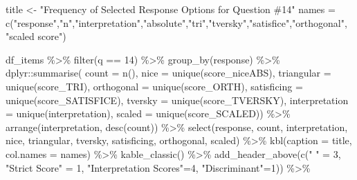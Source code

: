 \documentclass[
  letterpaper,
  DIV=11,
  numbers=noendperiod]{scrreprt}
\newenvironment{Shaded}{\begin{snugshade}}{\end{snugshade}}
\newcommand{\AttributeTok}[1]{\textcolor[rgb]{0.40,0.45,0.13}{#1}}
\newcommand{\DecValTok}[1]{\textcolor[rgb]{0.68,0.00,0.00}{#1}}
\newcommand{\FunctionTok}[1]{\textcolor[rgb]{0.28,0.35,0.67}{#1}}
\newcommand{\NormalTok}[1]{\textcolor[rgb]{0.00,0.23,0.31}{#1}}
\newcommand{\OtherTok}[1]{\textcolor[rgb]{0.00,0.23,0.31}{#1}}
\newcommand{\SpecialCharTok}[1]{\textcolor[rgb]{0.37,0.37,0.37}{#1}}
\newcommand{\StringTok}[1]{\textcolor[rgb]{0.13,0.47,0.30}{#1}}
\begin{document}
\begin{Shaded}
\begin{Highlighting}[]
\NormalTok{title }\OtherTok{\textless{}{-}} \StringTok{"Frequency of Selected Response Options for Question \#14"}
\NormalTok{names }\OtherTok{=} \FunctionTok{c}\NormalTok{(}\StringTok{"response"}\NormalTok{,}\StringTok{"n"}\NormalTok{,}\StringTok{"interpretation"}\NormalTok{,}\StringTok{"absolute"}\NormalTok{,}\StringTok{"tri"}\NormalTok{,}\StringTok{"tversky"}\NormalTok{,}\StringTok{"satisfice"}\NormalTok{,}\StringTok{"orthogonal"}\NormalTok{, }\StringTok{"scaled score"}\NormalTok{)}

\NormalTok{df\_items }\SpecialCharTok{\%\textgreater{}\%} \FunctionTok{filter}\NormalTok{(q }\SpecialCharTok{==} \DecValTok{14}\NormalTok{) }\SpecialCharTok{\%\textgreater{}\%} \FunctionTok{group\_by}\NormalTok{(response) }\SpecialCharTok{\%\textgreater{}\%}
\NormalTok{  dplyr}\SpecialCharTok{::}\FunctionTok{summarise}\NormalTok{( }\AttributeTok{count =} \FunctionTok{n}\NormalTok{(),}
                    \AttributeTok{nice =} \FunctionTok{unique}\NormalTok{(score\_niceABS),}
                    \AttributeTok{triangular =} \FunctionTok{unique}\NormalTok{(score\_TRI),}
                    \AttributeTok{orthogonal =}  \FunctionTok{unique}\NormalTok{(score\_ORTH),}
                    \AttributeTok{satisficing =}  \FunctionTok{unique}\NormalTok{(score\_SATISFICE),}
                    \AttributeTok{tversky =} \FunctionTok{unique}\NormalTok{(score\_TVERSKY),}
                    \AttributeTok{interpretation =} \FunctionTok{unique}\NormalTok{(interpretation),}
                    \AttributeTok{scaled =} \FunctionTok{unique}\NormalTok{(score\_SCALED)) }\SpecialCharTok{\%\textgreater{}\%}
  \FunctionTok{arrange}\NormalTok{(interpretation, }\FunctionTok{desc}\NormalTok{(count)) }\SpecialCharTok{\%\textgreater{}\%}
  \FunctionTok{select}\NormalTok{(response, count, interpretation, nice,}
\NormalTok{         triangular, tversky, satisficing, orthogonal, scaled) }\SpecialCharTok{\%\textgreater{}\%}
  \FunctionTok{kbl}\NormalTok{(}\AttributeTok{caption =}\NormalTok{ title, }\AttributeTok{col.names =}\NormalTok{ names) }\SpecialCharTok{\%\textgreater{}\%}  \FunctionTok{kable\_classic}\NormalTok{() }\SpecialCharTok{\%\textgreater{}\%}
  \FunctionTok{add\_header\_above}\NormalTok{(}\FunctionTok{c}\NormalTok{(}\StringTok{" "} \OtherTok{=} \DecValTok{3}\NormalTok{, }\StringTok{"Strict Score"} \OtherTok{=} \DecValTok{1}\NormalTok{, }\StringTok{"Interpretation Scores"}\OtherTok{=}\DecValTok{4}\NormalTok{, }\StringTok{"Discriminant"}\OtherTok{=}\DecValTok{1}\NormalTok{)) }\SpecialCharTok{\%\textgreater{}\%}

\end{Highlighting}
\end{Shaded}
\end{document}
